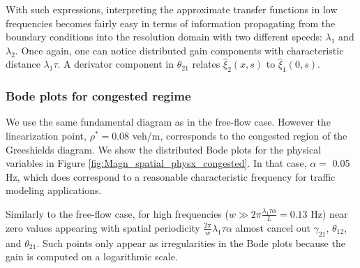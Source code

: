 \documentclass[a4paper, 10pt, conference]{ieeeconf}      %
\begin{document}
With such expressions, interpreting the approximate transfer functions in low frequencies becomes fairly easy in terms of information propagating from the boundary conditions into the resolution domain with two different speeds: $\lambda_1$ and $\lambda_2$. Once again, one can notice distributed gain components with characteristic distance $\lambda_1 \tau$. A derivator component in $\theta_{21}$ relates $\hat{\xi}_2(x,s)$ to $\hat{\xi}_1(0,s)$.\\

\subsubsection{Bode plots for congested regime}
We use the same fundamental diagram as in the free-flow case. However the linearization point, $\rho^* = 0.08$ veh/m, corresponds to the congested region of the Greeshields diagram. We show the distributed Bode plots for the physical variables in Figure \ref{fig:Magn_spatial_physx_congested}. In that case, $\alpha =$ 0.05 Hz, which does correspond to a reasonable characteristic frequency for traffic modeling applications.

Similarly to the free-flow case, for high frequencies ($w \gg 2 \pi \frac{\lambda_{1} \tau \alpha}{L} = 0.13$ Hz) near zero values appearing with spatial periodicity $\frac{2 \pi}{w} \lambda_{1} \tau \alpha$ almost cancel out $\gamma_{21}$, $\theta_{12}$, and $\theta_{21}$. Such points only appear as irregularities in the Bode plots because the gain is computed on a logarithmic scale.\\
\end{document}
